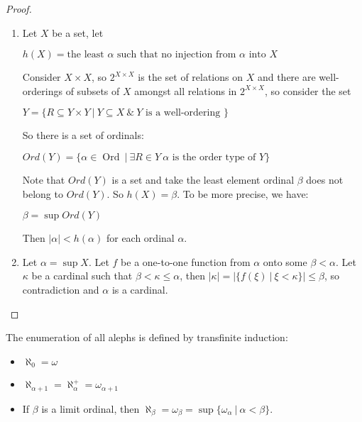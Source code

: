\documentclass[8pt]{article}
\theoremstyle{definition}
\theoremstyle{definition}
\theoremstyle{definition}
\theoremstyle{definition}
\theoremstyle{definition}
\theoremstyle{definition}
\theoremstyle{definition}
\theoremstyle{definition}
\theoremstyle{definition}
\theoremstyle{definition}
\theoremstyle{definition}
\theoremstyle{definition}
\theoremstyle{definition}
\theoremstyle{definition}
\theoremstyle{question}
\begin{document}
\begin{proof}
  $ $

  \begin{enumerate}
    \item Let $X$ be a set, let 
    \begin{center}
      $h(X) = \text{the least $\alpha$ such that no injection from $\alpha$ into $X$}$
    \end{center}

    Consider $X \times X$, so $2^{X \times X}$ is the set of relations on $X$ and there 
    are well-orderings of subsets of $X$ amongst all relations in $2^{X \times X}$, so consider the set
    \begin{center}
      $Y = \{ R \subseteq Y \times Y \: | \: Y \subseteq X \: \& \: \text{$Y$ is a well-ordering }\}$
    \end{center}

    So there is a set of ordinals:
    \begin{center}
      $Ord(Y) = \{ \alpha \in \operatorname{Ord} \: | \: \exists R \in Y \: \text{$\alpha$ is the order type of $Y$}  \}$
    \end{center}
    Note that $Ord(Y)$ is a set and take the least element ordinal $\beta$ does not belong to $Ord(Y)$. So $h(X) = \beta$.
    To be more precise, we have:
    \begin{center}
      $\beta = \sup Ord(Y)$
    \end{center}

    Then $|\alpha| < h(\alpha)$ for each ordinal $\alpha$.

    \item Let $\alpha = \sup X$. Let $f$ be a one-to-one function from $\alpha$ onto some $\beta < \alpha$.
    Let $\kappa$ be a cardinal such that $\beta < \kappa \leq \alpha$, then $|\kappa| = |\{ f(\xi) \: | \: \xi < \kappa \}| \leq \beta$, 
    so contradiction and $\alpha$ is a cardinal.
  \end{enumerate}
\end{proof}

The enumeration of all alephs is defined by transfinite induction:
\begin{itemize}
  \item $\aleph_0 = \omega$
  \item $\aleph_{\alpha + 1} =\aleph_{\alpha}^+ = \omega_{\alpha+1}$
  \item If $\beta$ is a limit ordinal, then $\aleph_{\beta} = \omega_{\beta} = \sup \{ \omega_{\alpha} \: | \: \alpha < \beta \}$.
\end{itemize}
\end{document}
